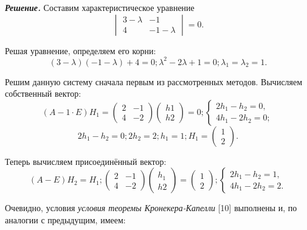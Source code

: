 \documentclass{article}
\begin{document}
 
\textbf{\textit{Решение.}} Составим характеристическое уравнение
$$
\begin{vmatrix}
3-\lambda & -1 \\
4 & -1-\lambda
\end{vmatrix} = 0.
$$
 
Решая уравнение, определяем его корни:
$$
(3-\lambda)(-1-\lambda)+4=0; \lambda^2 - 2\lambda+1=0; \lambda_1=\lambda_2=1.
$$
 
Решим данную систему сначала первым из рассмотренных методов. Вычисляем собственный вектор:
$$
(A-1\cdot E)H_1=\begin{pmatrix} 
2 & -1 \\
4 & -2
\end{pmatrix} \begin{pmatrix}
    h1 \\
    h2
\end{pmatrix} = 0; \begin{cases}
    2h_1-h_2=0, \\
    4h_1-2h_2=0;
\end{cases}
$$
$$
2h_1-h_2=0; 2h_2=2; h_1=1; H_1=\begin{pmatrix}
    1 \\
    2
\end{pmatrix}.
$$
 
Теперь вычисляем присоединённый вектор:
$$
(A-E)H_2=H_1; \begin{pmatrix} 
2 & -1 \\
4 & -2
\end{pmatrix} \begin{pmatrix}
    h_1 \\
    h2
\end{pmatrix}=\begin{pmatrix}
    1 \\
    2
\end{pmatrix}; \begin{cases}
    2h_1-h_2=1, \\
    4h_1-2h_2=2.
\end{cases}
$$
 
Очевидно, условия \textit{условия теоремы Кронекера-Капелли} [10] выполнены и, по аналогии с предыдущим, имеем:
\end{document}
